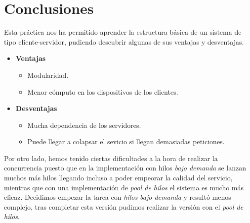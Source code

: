 \documentclass[10pt, spanish, pdftex]{template/UC3M_document}
\begin{document}
\newpage


\section{Conclusiones}
Esta práctica nos ha permitido aprender la estructura básica de un sistema de tipo cliente-servidor, pudiendo descubrir algunas de sus ventajas y desventajas.

\begin{itemize}
  \item \textbf{Ventajas}
    \begin{itemize}
      \item Modularidad.
      \item Menor cómputo en los dispositivos de los clientes.
    \end{itemize}
  \item \textbf{Desventajas}
  \begin{itemize}
    \item Mucha dependencia de los servidores.
    \item Puede llegar a colapsar el sevicio si llegan demasiadas peticiones.
  \end{itemize}
\end{itemize}

Por otro lado, hemos tenido ciertas dificultades a la hora de realizar la concurrencia puesto que en la implementación con hilos \textit{bajo demanda} se lanzan muchos más hilos llegando incluso a poder empeorar la calidad del servicio, mientras que con una implementación de \textit{pool de hilos} el sistema es mucho más eficaz. Decidimos empezar la tarea con \textit{hilos bajo demanda} y resultó menos complejo, tras completar esta versión pudimos realizar la versión con el \textit{pool de hilos}.
\end{document}
